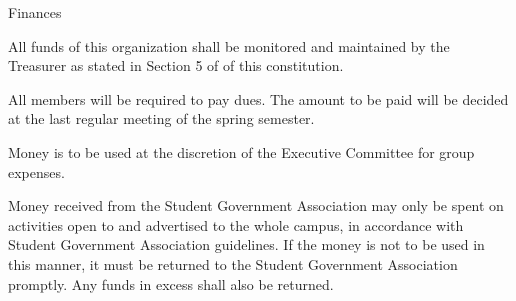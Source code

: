 {
\begin{article}{Finances}
	\item All funds of this organization shall be monitored and maintained by the Treasurer as stated in Section 5 of  of this constitution.
	\item All members will be required to pay dues.  The amount to be paid will be decided at the last regular meeting of the spring semester.
	\item Money is to be used at the discretion of the Executive Committee for group expenses.
	\item Money received from the Student Government Association may only be spent on activities open to and advertised to the whole campus, in accordance with Student Government Association guidelines.  If the money is not to be used in this manner, it must be returned to the Student Government Association promptly.  Any funds in excess shall also be returned.
\end{article}
}